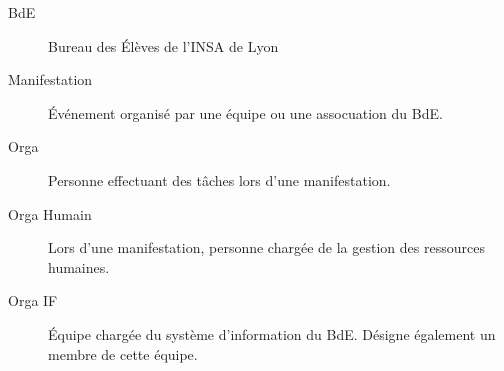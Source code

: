 \begin{description}
\item[BdE] Bureau des Élèves de l'INSA de Lyon
\item[Manifestation] Événement organisé par une équipe ou une assocuation du BdE.
\item[Orga] Personne effectuant des tâches lors d'une manifestation.
\item[Orga Humain] Lors d'une manifestation, personne chargée de la gestion des ressources humaines.
\item[Orga IF] Équipe chargée du système d'information du BdE. Désigne également un membre de cette équipe.

 \end{description}